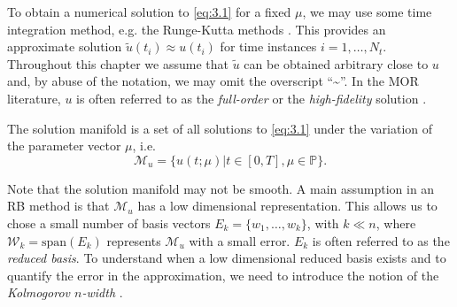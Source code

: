 To obtain a numerical solution to \eqref{eq:3.1} for a fixed $\mu$, we may use some time integration method, e.g. the Runge-Kutta methods \cite{edsberg2015introduction}. This provides an approximate solution $\tilde u(t_i) \approx u(t_i)$ for time instances $i = 1 , \dots , N_t$. Throughout this chapter we assume that $\tilde u$ can be obtained arbitrary close to $u$ and, by abuse of the notation, we may omit the overscript ``\textasciitilde''. In the MOR literature, $u$ is often referred to as the \emph{full-order} or the \emph{high-fidelity} solution \cite{hesthaven2015certified,quarteroni2015reduced}. 

\begin{definition}
The solution manifold is a set of all solutions to \eqref{eq:3.1} under the variation of the parameter vector $\mu$, i.e.
\begin{equation} \label{eq:3.2}
	\mathcal M_{u} = \{ u(t;\mu) | t \in [0,T] , \mu \in \mathbb P \}.
\end{equation}
\end{definition}
Note that the solution manifold may not be smooth. A main assumption in an RB method is that $\mathcal M_{u}$ has a low dimensional representation. This allows us to chose a small number of basis vectors $E_k = \{ w_1,\dots,w_k\}$, with $k\ll n$, where $\mathcal W_k = \text{span}(E_k)$ represents $\mathcal M_{u}$ with a small error. $E_k$ is often referred to as the \emph{reduced basis}. To understand when a low dimensional reduced basis exists and to quantify the error in the approximation, we need to introduce the notion of the \emph{Kolmogorov $n$-width} \cite{Kolmogoroff:1936fj,pinkus1985n}.

